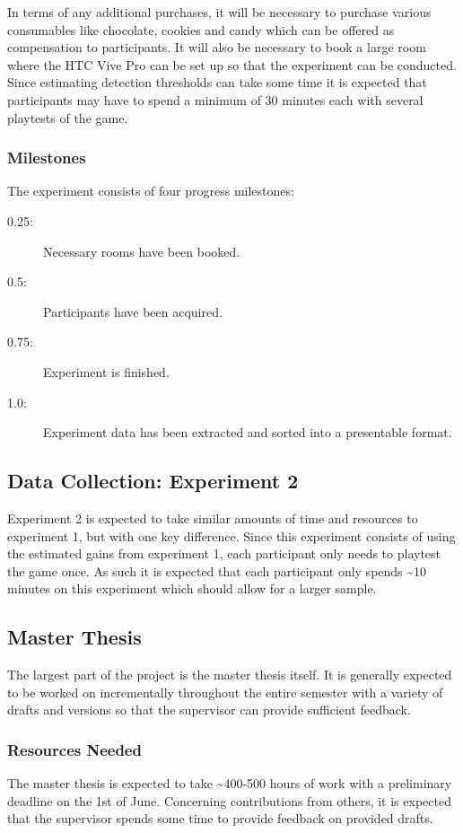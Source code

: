 In terms of any additional purchases, it will be necessary to purchase various consumables like chocolate, cookies and candy which can be offered as compensation to participants. It will also be necessary to book a large room where the HTC Vive Pro can be set up so that the experiment can be conducted. Since estimating detection thresholds can take some time it is expected that participants may have to spend a minimum of 30 minutes each with several playtests of the game.  

\subsubsection{Milestones}
The experiment consists of four progress milestones:

\begin{description}
\item[0.25: ] Necessary rooms have been booked.
\item[0.5: ] Participants have been acquired.
\item[0.75: ] Experiment is finished.
\item[1.0: ] Experiment data has been extracted and sorted into a presentable format. 
\end{description}

\subsection{Data Collection: Experiment 2}
Experiment 2 is expected to take similar amounts of time and resources to experiment 1, but with one key difference. Since this experiment consists of using the estimated gains from experiment 1, each participant only needs to playtest the game once. As such it is expected that each participant only spends \textasciitilde 10 minutes on this experiment which should allow for a larger sample. 

\subsection{Master Thesis}
The largest part of the project is the master thesis itself. It is generally expected to be worked on incrementally throughout the entire semester with a variety of drafts and versions so that the supervisor can provide sufficient feedback. 

\subsubsection{Resources Needed}
The master thesis is expected to take \textasciitilde 400-500 hours of work with a preliminary deadline on the 1st of June. Concerning contributions from others, it is expected that the supervisor spends some time to provide feedback on provided drafts. 

